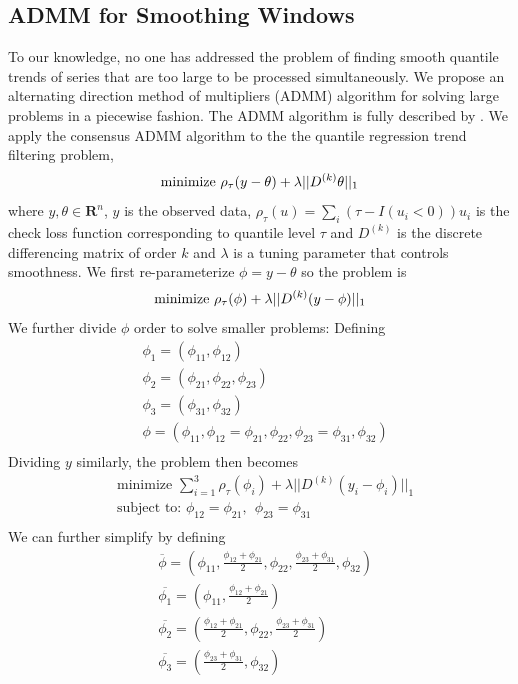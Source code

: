 \documentclass[12pt]{article}
\begin{document}
	\subsection{ADMM for Smoothing Windows}
	
	To our knowledge, no one has addressed the problem of finding smooth quantile trends of series that are too large to be processed simultaneously. We propose an alternating direction method of multipliers (ADMM) algorithm for solving large problems in a piecewise fashion. The ADMM algorithm is fully described by \cite{boyd2011distributed}. We apply the consensus ADMM algorithm to the the quantile regression trend filtering problem, 
	\begin{equation}
	\text{minimize } \rho_\tau(y-\theta) + \lambda||D^{(k)}\theta||_1\\
	\end{equation}
	where $y,\theta \in \mathbf{R}^n$, $y$ is the observed data, $\rho_{\tau}(u) = \sum_i(\tau - I(u_i < 0))u_i$ is the check loss function corresponding to quantile level $\tau$ and $D^{(k)}$ is the discrete differencing matrix of order $k$ and $\lambda$ is a tuning parameter that controls smoothness. We first re-parameterize $\phi = y-\theta$ so the problem is
	\begin{equation}
	\text{minimize } \rho_\tau(\phi) + \lambda||D^{(k)}(y-\phi)||_1\\
	\end{equation}
	We further divide $\phi$ order to solve smaller problems: Defining
	\begin{align}
	&\phi_1 = (\phi_{11}, \phi_{12})\\
	&\phi_2 = (\phi_{21}, \phi_{22}, \phi_{23})\\
	&\phi_3 = (\phi_{31}, \phi_{32})\\
	&\phi = (\phi_{11}, \phi_{12}=\phi_{21}, \phi_{22}, \phi_{23}=\phi_{31}, \phi_{32}) \\
	\end{align}
	Dividing $y$ similarly, the problem then becomes 
	\begin{align}
	&\text{minimize } \sum_{i=1}^3 \rho_\tau(\phi_i) + \lambda||D^{(k)}(y_i-\phi_i)||_1\\
	&\text{subject to: } \phi_{12}=\phi_{21}, ~~ \phi_{23}=\phi_{31}\\
	\end{align}
	We can further simplify by defining 
	\begin{align}
	&\overline{\phi} = (\phi_{11}, \frac{\phi_{12}+\phi_{21}}{2}, \phi_{22}, \frac{\phi_{23}+\phi_{31}}{2}, \phi_{32}) \\
	&\overline{\phi_1} = (\phi_{11}, \frac{\phi_{12}+\phi_{21}}{2})\\
	&\overline{\phi_2} = ( \frac{\phi_{12}+\phi_{21}}{2}, \phi_{22}, \frac{\phi_{23}+\phi_{31}}{2})\\
	&\overline{\phi_3} = (\frac{\phi_{23}+\phi_{31}}{2}, \phi_{32})
	\end{align}
\end{document}
